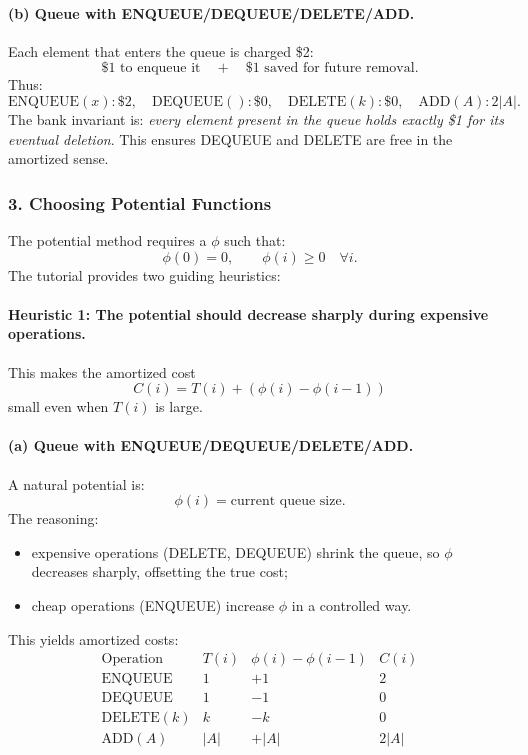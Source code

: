 \documentclass[9pt]{extarticle}
\begin{document}
\paragraph{(b) Queue with ENQUEUE/DEQUEUE/DELETE/ADD.}
Each element that enters the queue is charged \$2:
\[
\$1 \text{ to enqueue it} \quad+\quad \$1 \text{ saved for future removal}.
\]
Thus:
\[
\text{ENQUEUE}(x): \$2,\quad \text{DEQUEUE}():\$0,\quad \text{DELETE}(k):\$0,\quad
\text{ADD}(A): 2|A|.
\]
The bank invariant is:  
\emph{every element present in the queue holds exactly \$1 for its eventual
deletion}.  
This ensures DEQUEUE and DELETE are free in the amortized sense.

\subsubsection*{3. Choosing Potential Functions}
The potential method requires a $\phi$ such that:
\[
\phi(0)=0,\qquad \phi(i)\ge 0 \quad \forall i.
\]
The tutorial provides two guiding heuristics:

\paragraph{Heuristic 1: The potential should decrease sharply during expensive operations.}
This makes the amortized cost
\[
C(i)=T(i)+(\phi(i)-\phi(i-1))
\]
small even when $T(i)$ is large.

\paragraph{(a) Queue with ENQUEUE/DEQUEUE/DELETE/ADD.}
A natural potential is:
\[
\phi(i) = \text{current queue size}.
\]
The reasoning:
\begin{itemize}
    \item expensive operations (DELETE, DEQUEUE) shrink the queue,
          so $\phi$ decreases sharply, offsetting the true cost;
    \item cheap operations (ENQUEUE) increase $\phi$ in a controlled way.
\end{itemize}
This yields amortized costs:
\[
\begin{array}{c|c|c|c}
\text{Operation} & T(i) & \phi(i)-\phi(i-1) & C(i) \\
\hline
\text{ENQUEUE} & 1 & +1 & 2 \\
\text{DEQUEUE} & 1 & -1 & 0 \\
\text{DELETE}(k) & k & -k & 0 \\
\text{ADD}(A) & |A| & +|A| & 2|A| \\
\end{array}
\]
\end{document}
